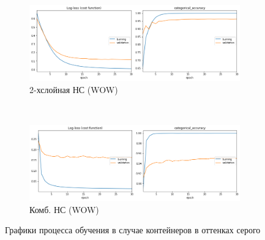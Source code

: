 \begin{figure}[p]
    \centering

    \begin{subfigure}{\textwidth}
        \includegraphics[width=\textwidth]{include/graphics/experimental_plots/grayscale/french_wow}
                    \caption{2-хслойная НС (WOW)}
    \end{subfigure}
    ~
    \begin{subfigure}{\textwidth}
        \includegraphics[width=\textwidth]{include/graphics/experimental_plots/grayscale/mixed_wow}
            \caption{Комб. НС (WOW)}
    \end{subfigure}

   \caption{Графики процесса обучения в случае контейнеров в оттенках серого}
    \label{fig:GrayscalePlotsWOW}
\end{figure}


